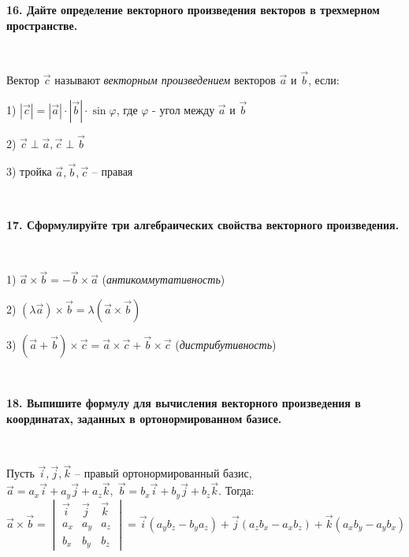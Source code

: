 \documentclass{article}
\begin{document}
	\textbf{16. Дайте определение векторного произведения векторов в трехмерном пространстве.} 
	
	{
		$\;$
		\setlength{\parindent}{0.4cm}
		\hangindent=0.4cm
		
		Вектор $\overrightarrow{c}$ называют \textit{векторным произведением} векторов $\overrightarrow{a}$ и $\overrightarrow{b}$, если:
		
		1) $|\overrightarrow{c}|=|\overrightarrow{a}|\cdot|\overrightarrow{b}|\cdot\sin\varphi$, где $\varphi$ - угол между $\overrightarrow{a}$ и $\overrightarrow{b}$
		
		2) $\overrightarrow{c}\perp\overrightarrow{a}, \overrightarrow{c}\perp\overrightarrow{b}$
		
		3) тройка $\overrightarrow{a}, \overrightarrow{b}, \overrightarrow{c}$ -- правая
		
		$\;$
		\setlength{\parindent}{0cm}
		\hangindent=0cm
	}
	
	\newpage
	
	\textbf{17. Сформулируйте три алгебраических свойства векторного произведения.} 
	
	{
		$\;$
		\setlength{\parindent}{0.4cm}
		\hangindent=0.4cm
		
		1) $\overrightarrow{a}\times\overrightarrow{b}=-\overrightarrow{b}\times\overrightarrow{a}$ (\textit{антикоммутативность})
		
		2) $(\lambda\overrightarrow{a})\times\overrightarrow{b}=\lambda(\overrightarrow{a}\times\overrightarrow{b})$
		
		3) $(\overrightarrow{a}+\overrightarrow{b})\times\overrightarrow{c}=\overrightarrow{a}\times\overrightarrow{c}+\overrightarrow{b}\times\overrightarrow{c}$ (\textit{дистрибутивность})
		
		$\;$
		\setlength{\parindent}{0cm}
		\hangindent=0cm
	}
	
	\textbf{18. Выпишите формулу для вычисления векторного произведения в координатах, заданных в ортонормированном базисе.} 
	
	{
		$\;$
		\setlength{\parindent}{0.4cm}
		\hangindent=0.4cm
		
		Пусть $\overrightarrow{i}, \overrightarrow{j}, \overrightarrow{k}$ -- правый ортонормированный базис, $\overrightarrow{a}=a_x\overrightarrow{i}+a_y\overrightarrow{j}+a_z\overrightarrow{k}, \; \overrightarrow{b}=b_x\overrightarrow{i}+b_y\overrightarrow{j}+b_z\overrightarrow{k}$. Тогда: $$\overrightarrow{a}\times\overrightarrow{b}=\begin{vmatrix}
		\overrightarrow{i}&\overrightarrow{j}&\overrightarrow{k}\\
		a_x&a_y&a_z\\
		b_x&b_y&b_z
		\end{vmatrix}=\overrightarrow{i}(a_yb_z-b_ya_z)+\overrightarrow{j}(a_zb_x-a_xb_z)+\overrightarrow{k}(a_xb_y-a_yb_x)$$
		
		$\;$
		\setlength{\parindent}{0cm}
		\hangindent=0cm
	}
	
\end{document}
